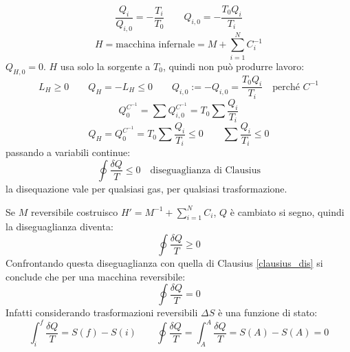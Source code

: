 \begin{equation*}\frac{Q_i}{Q_{i,0}}=-\frac{T_i}{T_0}\qquad Q_{i,0}=-\frac{T_0Q_i}{T_i}\end{equation*}
\begin{equation*}H=\text{macchina infernale}=M+\sum_{i=1}^{N}C_i^{-1}\end{equation*}
$Q_{H,0}=0$. $H$ usa solo la sorgente a $T_0$, quindi non può produrre lavoro:
\begin{equation*}L_H\geq0\qquad Q_H=-L_H\leq 0\qquad Q_{i,0}:=-Q_{i,0}=\frac{T_0Q_i}{T_i}\quad\text{perché $C^{-1}$}\end{equation*}
\begin{equation*}Q_0^{C^{-1}}=\sum Q_{i,0}^{C^{-1}}=T_0\sum\frac{Q_i}{T_i}\end{equation*}
\begin{equation*}Q_H=Q_0^{C^{-1}}=T_0\sum\frac{Q_i}{T_i}\leq 0\qquad \sum\frac{Q_i}{T_i}\leq 0\end{equation*}
passando a variabili continue:
\begin{equation}
\oint\frac{\delta Q}{T}\leq 0\quad\text{diseguaglianza di Clausius}
\label{clausius_dis}
\end{equation}
la disequazione vale per qualsiasi gas, per qualsiasi trasformazione.

Se $M$ reversibile costruisco $H'=M^{-1}+\sum_{i=1}^N C_i$, $Q$ è cambiato si segno, quindi la diseguaglianza diventa:
\begin{equation*}\oint\frac{\delta Q}{T}\geq0\end{equation*}
Confrontando questa diseguaglianza con quella di Clausius \eqref{clausius_dis} si conclude che per una macchina reversibile:
\begin{equation}
\oint\frac{\delta Q}{T}=0
\end{equation}
Infatti considerando trasformazioni reversibili $\Delta S$ è una funzione di stato:
\begin{equation*}\int_i^f\frac{\delta Q}{T}=S(f)-S(i)\qquad\oint\frac{\delta Q}{T}=\int_A^A\frac{\delta Q}{T}=S(A)-S(A)=0\end{equation*}

